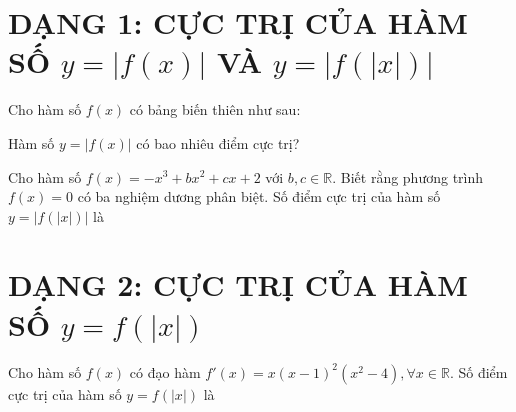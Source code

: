 \documentclass[12pt,a4paper]{article}
\begin{document}
\section*{DẠNG 1: CỰC TRỊ CỦA HÀM SỐ $y=|f(x)|$ VÀ $y=|f(|x|)|$}
 Cho hàm số $f(x)$ có bảng biến thiên như sau:
\begin{center}
\end{center}
Hàm số $y=|f(x)|$ có bao nhiêu điểm cực trị?

 Cho hàm số $f(x)=-x^3+bx^2+cx+2$ với $b,c\in\mathbb{R}$. Biết rằng phương trình $f(x)=0$ có ba nghiệm dương phân biệt. Số điểm cực trị của hàm số $y=|f(|x|)|$ là
\section*{DẠNG 2: CỰC TRỊ CỦA HÀM SỐ $y=f(|x|)$}
 Cho hàm số $f(x)$ có đạo hàm $f'(x)=x(x-1)^2(x^2-4),\forall x\in\mathbb{R}$. Số điểm cực trị của hàm số $y=f(|x|)$ là
\end{document}
